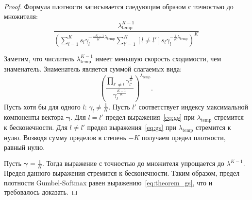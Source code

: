 \begin{proof} 
Формула плотности записывается следующим образом с точностью до множителя:
\[
       \frac{\lambda_{\text{temp}}^{K-1}}{\left(\sum_{l=1}^K s_l\gamma_l^{-\frac{-K-1}{K}\lambda_\text{temp}}\sum_{l'=1}^K [l \neq l']s_l\gamma_l^{-\frac{1}{K}\lambda_\text{temp}}\right)^{K}}
\]


Заметим, что числитель $\lambda_{\text{temp}}^{K-1}$ имеет меньшую скорость сходимости, чем знаменатель. 
Знаменатель является суммой слагаемых вида:
\begin{equation}
\label{eq:gs}
    \left(\frac{\prod_{l' \neq l} \gamma_{l'}^{\frac{1}{K}}}{\gamma_l^{\frac{K-1}{K}}}\right)^{\lambda_{\text{temp}}}.
\end{equation}
Пусть хотя бы для одного $l$: $\gamma_l \neq \frac{1}{K}$. Пусть $l'$ соответствует индексу максимальной компоненты вектора $\boldsymbol{\gamma}$.
Для $l=l'$ предел выражения~\eqref{eq:gs} при $\lambda_{\text{temp}}$ стремится к бесконечности. Для $l\neq l'$ предел выражения~\eqref{eq:gs} при $\lambda_{\text{temp}}$ стремится к нулю. Возводя сумму пределов в степень $-K$ получаем предел плотности, равный нулю.

Пусть $\boldsymbol{\gamma} = \frac{1}{K}$.
Тогда выражение с точностью до множителя упрощается до $\lambda^{K-1}$. Предел данного выражения стремится к бесконечности.
Таким образом, предел плотности Gumbel-Softmax равен выражению~\eqref{eq:theorem_gs}, что и требовалось доказать.

\end{proof}


